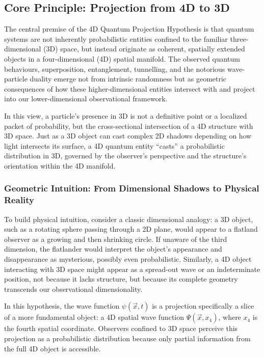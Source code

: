 \documentclass[12pt]{article}
\begin{document}
\subsection{Core Principle: Projection from 4D to 3D}

The central premise of the 4D Quantum Projection Hypothesis is that quantum systems are not inherently probabilistic entities confined to the familiar three-dimensional (3D) space, but instead originate as coherent, spatially extended objects in a four-dimensional (4D) spatial manifold. The observed quantum behaviours, superposition, entanglement, tunnelling, and the notorious wave-particle duality emerge not from intrinsic randomness but as geometric consequences of how these higher-dimensional entities intersect with and project into our lower-dimensional observational framework.

In this view, a particle’s presence in 3D is not a definitive point or a localized packet of probability, but the cross-sectional intersection of a 4D structure with 3D space. Just as a 3D object can cast complex 2D shadows depending on how light intersects its surface, a 4D quantum entity “casts” a probabilistic distribution in 3D, governed by the observer’s perspective and the structure’s orientation within the 4D manifold.
\newpage
\subsubsection*{Geometric Intuition: From Dimensional Shadows to Physical Reality}

To build physical intuition, consider a classic dimensional analogy: a 3D object, such as a rotating sphere passing through a 2D plane, would appear to a flatland observer as a growing and then shrinking circle. If unaware of the third dimension, the flatlander would interpret the object’s appearance and disappearance as mysterious, possibly even probabilistic. Similarly, a 4D object interacting with 3D space might appear as a spread-out wave or an indeterminate position, not because it lacks structure, but because its complete geometry transcends our observational dimensionality.

In this hypothesis, the wave function $\psi(\vec{x}, t)$ is a projection specifically a slice of a more fundamental object: a 4D spatial wave function $\Psi(\vec{x}, x_4)$, where $x_4$ is the fourth spatial coordinate. Observers confined to 3D space perceive this projection as a probabilistic distribution because only partial information from the full 4D object is accessible.
\end{document}
